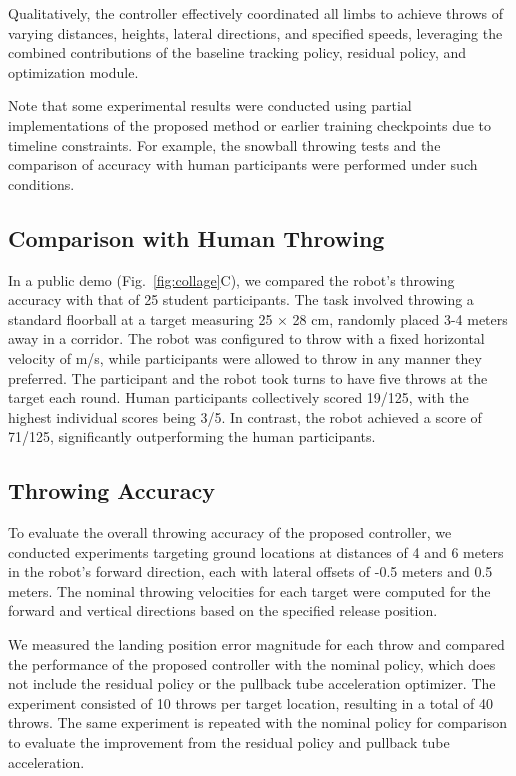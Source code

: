 \documentclass[letterpaper, 10 pt, conference]{ieeeconf} %
\begin{document}
Qualitatively, the controller effectively coordinated all limbs to achieve throws of varying distances, heights, lateral directions, and specified speeds, leveraging the combined contributions of the baseline tracking policy, residual policy, and optimization module.

Note that some experimental results were conducted using partial implementations of the proposed method or earlier training checkpoints due to timeline constraints. For example, the snowball throwing tests and the comparison of accuracy with human participants were performed under such conditions.

\subsection{Comparison with Human Throwing}

In a public demo (Fig.~\ref{fig:collage}C), we compared the robot’s throwing accuracy with that of 25 student participants. The task involved throwing a standard floorball at a target measuring 25 × 28 cm, randomly placed 3-4 meters away in a corridor. The robot was configured to throw with a fixed horizontal velocity of \unit[6]{m/s}, while participants were allowed to throw in any manner they preferred. The participant and the robot took turns to have five throws at the target each round. Human participants collectively scored 19/125, with the highest individual scores being 3/5. In contrast, the robot achieved a score of 71/125, significantly outperforming the human participants.

\subsection{Throwing Accuracy}

To evaluate the overall throwing accuracy of the proposed controller, we conducted experiments targeting ground locations at distances of 4 and 6 meters in the robot’s forward direction, each with lateral offsets of -0.5 meters and 0.5 meters. The nominal throwing velocities for each target were computed for the forward and vertical directions based on the specified release position.

We measured the landing position error magnitude for each throw and compared the performance of the proposed controller with the nominal policy, which does not include the residual policy or the pullback tube acceleration optimizer. The experiment consisted of 10 throws per target location, resulting in a total of 40 throws. The same experiment is repeated with the nominal policy for comparison to evaluate the improvement from the residual policy and pullback tube acceleration.
\end{document}
